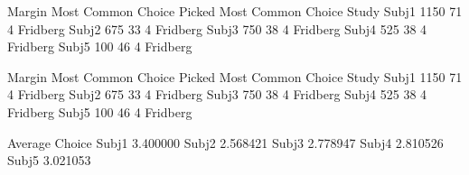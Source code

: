 \documentclass[letterpaper,10pt,english]{jupyterBook}
\begin{document}
\begin{sphinxVerbatim}[commandchars=\\\{\}]
        Margin  Most Common Choice Picked  Most Common Choice     Study
Subj\PYGZus{}1    1150                         71                   4  Fridberg
Subj\PYGZus{}2    \PYGZhy{}675                         33                   4  Fridberg
Subj\PYGZus{}3    \PYGZhy{}750                         38                   4  Fridberg
Subj\PYGZus{}4    \PYGZhy{}525                         38                   4  Fridberg
Subj\PYGZus{}5     100                         46                   4  Fridberg
\end{sphinxVerbatim}

\begin{sphinxVerbatim}[commandchars=\\\{\}]
  
  
  
\PYG{p}{[}\PYG{p}{]}  \PYG{p}{[}\PYG{p}{]}
\end{sphinxVerbatim}

\begin{sphinxVerbatim}[commandchars=\\\{\}]
        Margin  Most Common Choice Picked  Most Common Choice     Study  \PYGZbs{}
Subj\PYGZus{}1    1150                         71                   4  Fridberg   
Subj\PYGZus{}2    \PYGZhy{}675                         33                   4  Fridberg   
Subj\PYGZus{}3    \PYGZhy{}750                         38                   4  Fridberg   
Subj\PYGZus{}4    \PYGZhy{}525                         38                   4  Fridberg   
Subj\PYGZus{}5     100                         46                   4  Fridberg   

        Average Choice  
Subj\PYGZus{}1        3.400000  
Subj\PYGZus{}2        2.568421  
Subj\PYGZus{}3        2.778947  
Subj\PYGZus{}4        2.810526  
Subj\PYGZus{}5        3.021053  
\end{sphinxVerbatim}
\end{document}
